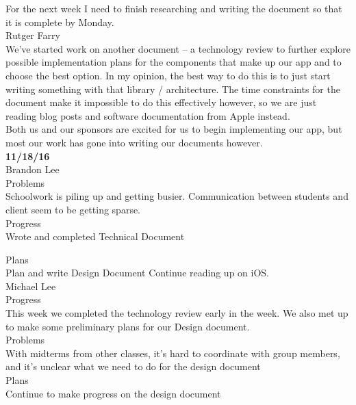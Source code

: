 \documentclass[letterpaper,10pt,titlepage]{article}
\begin{document}
For the next week I need to finish researching and writing the document so that it is complete by Monday.\\

Rutger Farry\\

We've started work on another document – a technology review to further explore possible implementation plans for the components that make up our app and to choose the best option. In my opinion, the best way to do this is to just start writing something with that library / architecture. The time constraints for the document make it impossible to do this effectively however, so we are just reading blog posts and software documentation from Apple instead.\\

Both us and our sponsors are excited for us to begin implementing our app, but most our work has gone into writing our documents however.\\

\textbf{11/18/16}\\

Brandon Lee\\

Problems\\
Schoolwork is piling up and getting busier.
Communication between students and client seem to be getting sparse.\\

Progress\\
Wrote and completed Technical Document

Plans\\
Plan and write Design Document
Continue reading up on iOS.\\

Michael Lee\\

Progress\\
This week we completed the technology review early in the week. We also met up to make some preliminary plans for our Design document.\\

Problems\\
With midterms from other classes, it's hard to coordinate with group members, and it's unclear what we need to do for the design document\\

Plans\\
Continue to make progress on the design document\\
\end{document}
